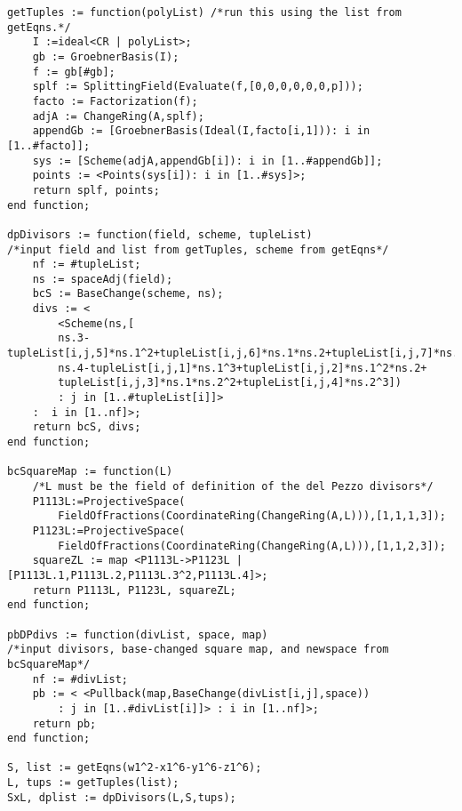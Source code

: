 \documentclass[12pt,twoside]{reedthesis}
\theoremstyle{plain}
\theoremstyle{definition}
\theoremstyle{remark}
\begin{document}
\begin{appendices}
\begin{verbatim}
getTuples := function(polyList) /*run this using the list from getEqns.*/
	I :=ideal<CR | polyList>;
	gb := GroebnerBasis(I);
	f := gb[#gb];
	splf := SplittingField(Evaluate(f,[0,0,0,0,0,0,p]));
	facto := Factorization(f);
	adjA := ChangeRing(A,splf);
	appendGb := [GroebnerBasis(Ideal(I,facto[i,1])): i in [1..#facto]];
	sys := [Scheme(adjA,appendGb[i]): i in [1..#appendGb]];
	points := <Points(sys[i]): i in [1..#sys]>;
	return splf, points;
end function;

dpDivisors := function(field, scheme, tupleList) 
/*input field and list from getTuples, scheme from getEqns*/
	nf := #tupleList;
	ns := spaceAdj(field);
	bcS := BaseChange(scheme, ns);
	divs := < 
		<Scheme(ns,[
		ns.3-tupleList[i,j,5]*ns.1^2+tupleList[i,j,6]*ns.1*ns.2+tupleList[i,j,7]*ns.2^2, 
		ns.4-tupleList[i,j,1]*ns.1^3+tupleList[i,j,2]*ns.1^2*ns.2+
		tupleList[i,j,3]*ns.1*ns.2^2+tupleList[i,j,4]*ns.2^3])
		: j in [1..#tupleList[i]]> 
	:  i in [1..nf]>;
	return bcS, divs;
end function;
	 
bcSquareMap := function(L) 
	/*L must be the field of definition of the del Pezzo divisors*/
	P1113L:=ProjectiveSpace(
		FieldOfFractions(CoordinateRing(ChangeRing(A,L))),[1,1,1,3]);
	P1123L:=ProjectiveSpace(
		FieldOfFractions(CoordinateRing(ChangeRing(A,L))),[1,1,2,3]);
	squareZL := map <P1113L->P1123L | [P1113L.1,P1113L.2,P1113L.3^2,P1113L.4]>;
	return P1113L, P1123L, squareZL;
end function;

pbDPdivs := function(divList, space, map) 
/*input divisors, base-changed square map, and newspace from bcSquareMap*/
	nf := #divList;
	pb := < <Pullback(map,BaseChange(divList[i,j],space)) 
		: j in [1..#divList[i]]> : i in [1..nf]>;
	return pb;
end function;

S, list := getEqns(w1^2-x1^6-y1^6-z1^6);
L, tups := getTuples(list);
SxL, dplist := dpDivisors(L,S,tups);

\end{verbatim}
\end{appendices}
\backmatter 



\end{document}
